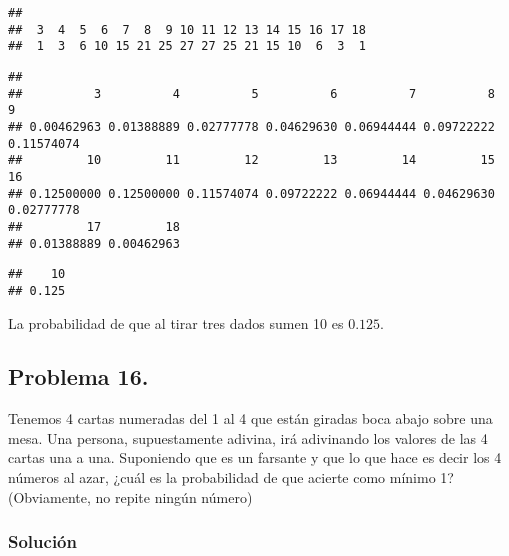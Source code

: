 \documentclass[
]{article}
\newenvironment{Shaded}{\begin{snugshade}}{\end{snugshade}}
\newcommand{\FunctionTok}[1]{\textcolor[rgb]{0.00,0.00,0.00}{#1}}
\newcommand{\NormalTok}[1]{#1}
\newcommand{\SpecialCharTok}[1]{\textcolor[rgb]{0.00,0.00,0.00}{#1}}
\newcommand{\StringTok}[1]{\textcolor[rgb]{0.31,0.60,0.02}{#1}}
\begin{document}
\begin{verbatim}
## 
##  3  4  5  6  7  8  9 10 11 12 13 14 15 16 17 18 
##  1  3  6 10 15 21 25 27 27 25 21 15 10  6  3  1
\end{verbatim}

\begin{Shaded}
\end{Shaded}

\begin{verbatim}
## 
##          3          4          5          6          7          8          9 
## 0.00462963 0.01388889 0.02777778 0.04629630 0.06944444 0.09722222 0.11574074 
##         10         11         12         13         14         15         16 
## 0.12500000 0.12500000 0.11574074 0.09722222 0.06944444 0.04629630 0.02777778 
##         17         18 
## 0.01388889 0.00462963
\end{verbatim}

\begin{Shaded}
\end{Shaded}

\begin{verbatim}
##    10 
## 0.125
\end{verbatim}

La probabilidad de que al tirar tres dados sumen 10 es \(0.125\).

\hypertarget{problema-16.}{%
\subsection{Problema 16.}\label{problema-16.}}

Tenemos 4 cartas numeradas del 1 al 4 que están giradas boca abajo sobre
una mesa. Una persona, supuestamente adivina, irá adivinando los valores
de las 4 cartas una a una. Suponiendo que es un farsante y que lo que
hace es decir los 4 números al azar, ¿cuál es la probabilidad de que
acierte como mínimo 1? (Obviamente, no repite ningún número)

\hypertarget{soluciuxf3n-16}{%
\subsubsection{Solución}\label{soluciuxf3n-16}}
\end{document}
